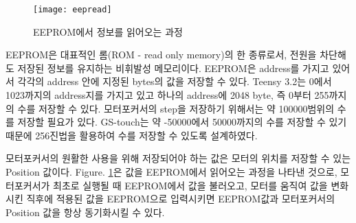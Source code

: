 \begin{figure}[ht]
	\begin{center}
		\texttt{[image: eepread]}
	\end{center}
	\caption{EEPROM에서 정보를 읽어오는 과정}
	\label{eepread}
\end{figure}

EEPROM은 대표적인 롬(ROM - read only memory)의 한 종류로서, 전원을 차단해도 저장된 정보를 유지하는 비휘발성 메모리이다. EEPROM은 address를 가지고 있어서 각각의 address 안에 지정된 bytes의 값을 저장할 수 있다. Teensy 3.2는 0에서 1023까지의 address지를 가지고 있고 하나의 address에 2048 byte, 즉 0부터 255까지의 수를 저장할 수 있다. 모터포커서의 step을 저장하기 위해서는 약 100000범위의 수를 저장할 필요가 있다. GS-touch는 약 -50000에서 50000까지의 수를 저장할 수 있기 때문에 256진법을 활용하여 수를 저장할 수 있도록 설계하였다.


 모터포커서의 원활한 사용을 위해 저장되어야 하는 값은 모터의 위치를 저장할 수 있는 Position 값이다. \textrm{Figure}. \ref{eepread}은 값을 EEPROM에서 읽어오는 과정을 나타낸 것으로, 모터포커서가 최초로 실행될 때 EEPROM에서 값을 불러오고, 모터를 움직여 값을 변화시킨 직후에 적용된 값을 EEPROM으로 입력시키면 EEPROM값과 모터포커서의 Position 값을 항상 동기화시킬 수 있다.


